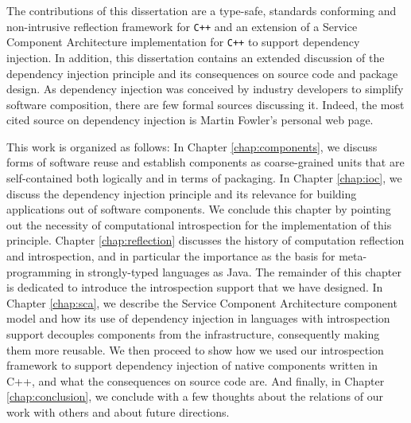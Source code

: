 The contributions of this dissertation are a type-safe, standards conforming and non-intrusive reflection framework for \texttt{C++} and
an extension of a Service Component Architecture implementation for \texttt{C++} to support dependency injection. In addition, this
dissertation contains an extended discussion of the dependency injection principle and its consequences on source code and 
package design. As dependency injection was conceived by industry developers to simplify software composition, there are few
formal sources discussing it. Indeed, the most cited source on dependency injection is Martin Fowler's personal web page.

This work is organized as follows: In Chapter \ref{chap:components}, we discuss forms of software reuse and establish components
as coarse-grained units that are self-contained both logically and in terms of packaging. In Chapter \ref{chap:ioc}, we discuss the dependency
injection principle and its relevance for building applications out of software components. We conclude this chapter by pointing
out the necessity of computational introspection for the implementation of this principle. Chapter \ref{chap:reflection} discusses
the history of computation reflection and introspection, and in particular the importance as the basis for meta-programming in
strongly-typed languages as Java. The remainder of this chapter is dedicated to introduce the introspection support that we
have designed. In Chapter \ref{chap:sca}, we describe the Service Component Architecture component model and how its use
of dependency injection in languages with introspection support decouples components from the infrastructure, consequently making
them more reusable. We then proceed to show how we used our introspection framework to support dependency injection of
native components written in C++, and what the consequences on source code are. And finally, in Chapter \ref{chap:conclusion}, we
conclude with a few thoughts about the relations of our work with others and about future directions.